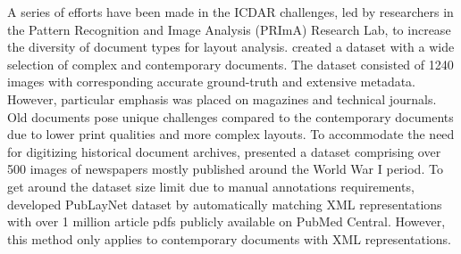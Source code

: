 \documentclass[letterpaper]{article} %
\begin{document}
A series of efforts have been made in the ICDAR challenges, led by researchers in the Pattern Recognition and Image Analysis (PRImA) Research Lab, to increase the diversity of document types for layout analysis. \cite{DBLP:conf/icdar/AntonacopoulosBPP09} created a dataset with a wide selection of complex and contemporary documents. The dataset consisted of 1240 images with corresponding accurate ground-truth and extensive metadata. However, particular emphasis was placed on magazines and technical journals. Old documents pose unique challenges compared to the contemporary documents due to lower print qualities and more complex layouts. To accommodate the need for digitizing historical document archives, \cite{DBLP:conf/icdar/ClausnerPPA15} presented a dataset comprising over 500 images of newspapers mostly published around the World War I period.
To get around the dataset size limit due to manual annotations requirements, \cite{DBLP:conf/icdar/ZhongTJ19} developed PubLayNet dataset by automatically matching XML representations with over 1 million article pdfs publicly available on PubMed Central. However, this method only applies to contemporary documents with XML representations.
\end{document}
